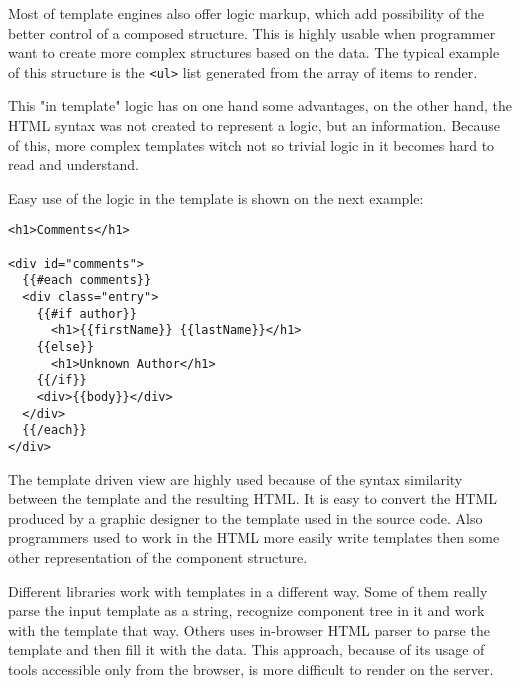 \documentclass[oneside, 12pt]{book}
\begin{document}


	Most of template engines also offer logic markup, which add possibility of the better control of a composed structure. 
	This is highly usable when programmer want to create more complex structures based on the data. 
	The typical example of this structure is the \texttt{<ul>} list generated from the array of items to render.
	
	This "in template" logic has on one hand some advantages, on the other hand, 
	the HTML syntax was not created to represent a logic, but an information.
	Because of this, more complex templates witch not so trivial logic in it becomes hard to read and understand.
	
	Easy use of the logic in the template is shown on the next example:
\begin{verbatim}
<h1>Comments</h1>

<div id="comments">
  {{#each comments}}
  <div class="entry">
    {{#if author}}
      <h1>{{firstName}} {{lastName}}</h1>
    {{else}}
      <h1>Unknown Author</h1>
    {{/if}}
    <div>{{body}}</div>
  </div>
  {{/each}}
</div>

\end{verbatim}



	The template driven view are highly used because of the syntax similarity between the template and the resulting HTML. 
	It is easy to convert the HTML produced by a graphic designer to the template used in the source code. 
	Also programmers used to work in the HTML more easily write templates then some other representation of the component structure.

	Different libraries work with templates in a different way. 
	Some of them really parse the input template as a string, recognize component tree in it and work with the template that way.
	Others uses in-browser HTML parser to parse the template and then fill it with the data.
	This approach, because of its usage of tools accessible only from the browser, is more difficult to render on the server.
\end{document}
